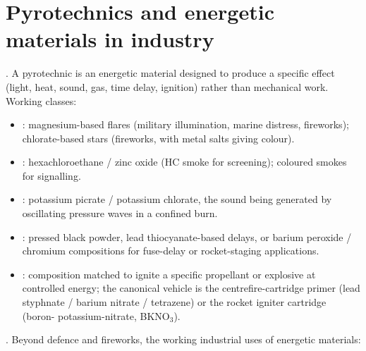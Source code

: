 \section{Pyrotechnics and energetic materials in industry}

. A pyrotechnic is an energetic
material designed to produce a specific effect (light, heat, sound,
gas, time delay, ignition) rather than mechanical work. Working
classes:

\begin{itemize}[leftmargin=*]
\item {}: magnesium-based flares (military
  illumination, marine distress, fireworks); chlorate-based stars
  (fireworks, with metal salts giving colour).
\item {}: hexachloroethane / zinc oxide
  (HC smoke for screening); coloured smokes for signalling.
\item {}: potassium picrate /
  potassium chlorate, the sound being generated by oscillating
  pressure waves in a confined burn.
\item {}: pressed black powder, lead
  thiocyanate-based delays, or barium peroxide / chromium compositions
  for fuse-delay or rocket-staging applications.
\item {}: composition matched to ignite a
  specific propellant or explosive at controlled energy; the canonical
  vehicle is the centrefire-cartridge primer (lead styphnate /
  barium nitrate / tetrazene) or the rocket igniter cartridge (boron-
  potassium-nitrate, BKNO$_3$).
\end{itemize}

. Beyond defence and
fireworks, the working industrial uses of energetic materials:

